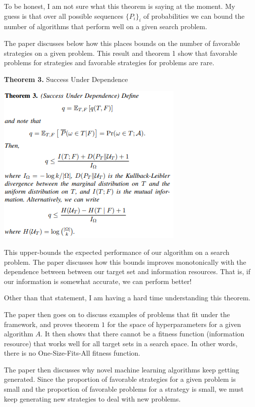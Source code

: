 \documentclass[12pt]{article}
\begin{document}
To be honest, I am not sure what this theorem is saying at the moment. My guess is that over all possible sequences $\{P_i\}_i$ of probabilities we can bound the number of algorithms that perform well on a given search problem. 

The paper discusses below how this places bounds on the number of favorable strategies on a given problem. This result and theorem 1 show that favorable problems for strategies and favorable strategies for problems are rare. 

\bigskip

\textbf{Theorem 3.} Success Under Dependence
\begin{center}
    \includegraphics{FamineForte/SuccessUnderDependence.PNG}
\end{center}

This upper-bounds the expected performance of our algorithm on a search problem. The paper discusses how this bounds improves monotonically with the dependence between between our target set and information resources. That is, if our information is somewhat accurate, we can perform better! 

Other than that statement, I am having a hard time understanding this theorem. 


\bigskip

The paper then goes on to discuss examples of problems that fit under the framework, and proves theorem $1$ for the space of hyperparameters for a given algorithm $A$. It then shows that there cannot be a fitness function (information resource) that works well for all target sets in a search space. In other words, there is no One-Size-Fits-All fitness function. 

\bigskip

The paper then discusses why novel machine learning algorithms keep getting generated. Since the proportion of favorable strategies for a given problem is small and the proportion of favorable problems for a strategy is small, we must keep generating new strategies to deal with new problems.  
\end{document}
